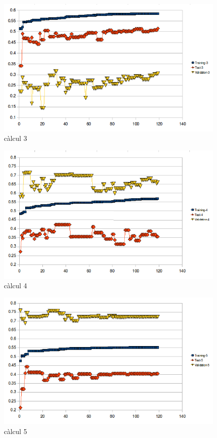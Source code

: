 \begin{figure}[h]
\begin{center}
\includegraphics[scale=0.75]{pholus/pholus3.png}
\end{center}
\caption{càlcul 3}
\label{fig:pholusResult3}
\end{figure}

\begin{figure}[h]
\begin{center}
\includegraphics[scale=0.75]{pholus/pholus4.png}
\end{center}
\caption{càlcul 4}
\label{fig:pholusResult4}
\end{figure}

\begin{figure}[h]
\begin{center}
\includegraphics[scale=0.75]{pholus/pholus5.png}
\end{center}
\caption{càlcul 5}
\label{fig:pholusResult5}
\end{figure}

